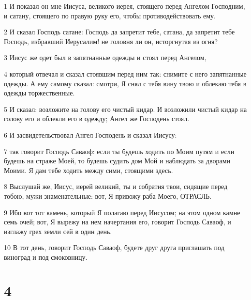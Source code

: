 \par 1 И показал он мне Иисуса, великого иерея, стоящего перед Ангелом Господним, и сатану, стоящего по правую руку его, чтобы противодействовать ему.
\par 2 И сказал Господь сатане: Господь да запретит тебе, сатана, да запретит тебе Господь, избравший Иерусалим! не головня ли он, исторгнутая из огня?
\par 3 Иисус же одет был в запятнанные одежды и стоял перед Ангелом,
\par 4 который отвечал и сказал стоявшим перед ним так: снимите с него запятнанные одежды. А ему самому сказал: смотри, Я снял с тебя вину твою и облекаю тебя в одежды торжественные.
\par 5 И сказал: возложите на голову его чистый кидар. И возложили чистый кидар на голову его и облекли его в одежду; Ангел же Господень стоял.
\par 6 И засвидетельствовал Ангел Господень и сказал Иисусу:
\par 7 так говорит Господь Саваоф: если ты будешь ходить по Моим путям и если будешь на страже Моей, то будешь судить дом Мой и наблюдать за дворами Моими. Я дам тебе ходить между сими, стоящими здесь.
\par 8 Выслушай же, Иисус, иерей великий, ты и собратия твои, сидящие перед тобою, мужи знаменательные: вот, Я привожу раба Моего, ОТРАСЛЬ.
\par 9 Ибо вот тот камень, который Я полагаю перед Иисусом; на этом одном камне семь очей; вот, Я вырежу на нем начертания его, говорит Господь Саваоф, и изглажу грех земли сей в один день.
\par 10 В тот день, говорит Господь Саваоф, будете друг друга приглашать под виноград и под смоковницу.

\chapter{4}


